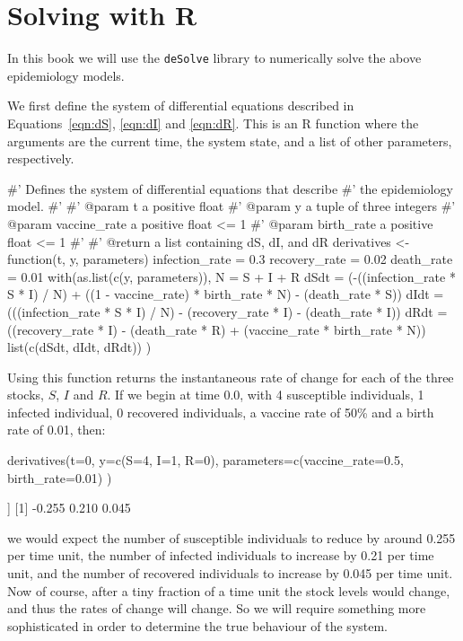 \section{Solving with R}\label{sec:solving-with-R}
In this book we will use the \texttt{deSolve} library to numerically
solve the above epidemiology models.

We first define the system of differential equations described in
Equations~\ref{eqn:dS}, \ref{eqn:dI} and \ref{eqn:dR}. This is an R function
where the arguments are the current time, the system state, and a list of other
parameters, respectively.

\begin{Rin}
#' Defines the system of differential equations that describe
#' the epidemiology model.
#'
#' @param t a positive float
#' @param y a tuple of three integers
#' @param vaccine_rate a positive float <= 1
#' @param birth_rate a positive float <= 1
#'
#' @return a list containing dS, dI, and dR
derivatives <- function(t, y, parameters){
  infection_rate = 0.3
  recovery_rate = 0.02
  death_rate = 0.01
  with(as.list(c(y, parameters)), {
    N = S + I + R
    dSdt = (-((infection_rate * S * I) / N)
           + ((1 - vaccine_rate) * birth_rate * N)
           - (death_rate * S))
    dIdt = (((infection_rate * S * I) / N)
           - (recovery_rate * I)
           - (death_rate * I))
    dRdt = ((recovery_rate * I)
           - (death_rate * R)
           + (vaccine_rate * birth_rate * N))
    list(c(dSdt, dIdt, dRdt))
})
}
\end{Rin}

Using this function returns the instantaneous rate of change for each of the
three stocks, $S$, $I$ and $R$. If we begin at time 0.0, with 4 susceptible
individuals, 1 infected individual, 0 recovered individuals, a vaccine rate
of 50\% and a birth rate of 0.01, then:

\begin{Rin}
derivatives(t=0,
            y=c(S=4, I=1, R=0),
            parameters=c(vaccine_rate=0.5, birth_rate=0.01)
)
\end{Rin}

\begin{Rout}
[[1]]
[1] -0.255  0.210  0.045
\end{Rout}

we would expect the number of susceptible individuals to reduce by around 0.255
per time unit, the number of infected individuals to increase by 0.21 per time
unit, and the number of recovered individuals to increase by 0.045 per time
unit. Now of course, after a tiny fraction of a time unit the stock levels would
change, and thus the rates of change will change. So we will require something
more sophisticated in order to determine the true behaviour of the system.

